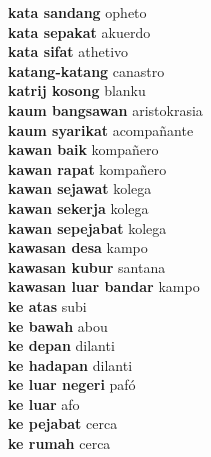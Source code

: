 \textbf{ kata sandang  } opheto \\
\textbf{ kata sepakat  } akuerdo \\
\textbf{ kata sifat  } athetivo \\
\textbf{ katang-katang  } canastro \\
\textbf{ katrij kosong  } blanku \\
\textbf{ kaum bangsawan  } aristokrasia \\
\textbf{ kaum syarikat  } acompañante \\
\textbf{ kawan baik  } kompañero \\
\textbf{ kawan rapat  } kompañero \\
\textbf{ kawan sejawat  } kolega \\
\textbf{ kawan sekerja  } kolega \\
\textbf{ kawan sepejabat  } kolega \\
\textbf{ kawasan desa  } kampo \\
\textbf{ kawasan kubur  } santana \\
\textbf{ kawasan luar bandar  } kampo \\
\textbf{ ke atas  } subi \\
\textbf{ ke bawah  } abou \\
\textbf{ ke depan  } dilanti \\
\textbf{ ke hadapan  } dilanti \\
\textbf{ ke luar negeri  } pafó \\
\textbf{ ke luar  } afo \\
\textbf{ ke pejabat  } cerca \\
\textbf{ ke rumah  } cerca \\
